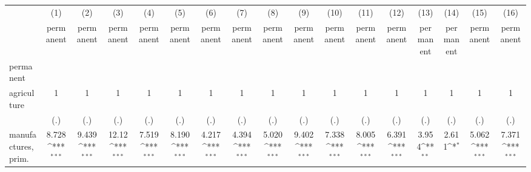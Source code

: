 {
\def\sym#1{\ifmmode^{#1}\else\(^{#1}\)\fi}
\begin{tabular}{l*{16}{c}}
\hline\hline
                    &\multicolumn{1}{c}{(1)}&\multicolumn{1}{c}{(2)}&\multicolumn{1}{c}{(3)}&\multicolumn{1}{c}{(4)}&\multicolumn{1}{c}{(5)}&\multicolumn{1}{c}{(6)}&\multicolumn{1}{c}{(7)}&\multicolumn{1}{c}{(8)}&\multicolumn{1}{c}{(9)}&\multicolumn{1}{c}{(10)}&\multicolumn{1}{c}{(11)}&\multicolumn{1}{c}{(12)}&\multicolumn{1}{c}{(13)}&\multicolumn{1}{c}{(14)}&\multicolumn{1}{c}{(15)}&\multicolumn{1}{c}{(16)}\\
                    &\multicolumn{1}{c}{permanent}&\multicolumn{1}{c}{permanent}&\multicolumn{1}{c}{permanent}&\multicolumn{1}{c}{permanent}&\multicolumn{1}{c}{permanent}&\multicolumn{1}{c}{permanent}&\multicolumn{1}{c}{permanent}&\multicolumn{1}{c}{permanent}&\multicolumn{1}{c}{permanent}&\multicolumn{1}{c}{permanent}&\multicolumn{1}{c}{permanent}&\multicolumn{1}{c}{permanent}&\multicolumn{1}{c}{permanent}&\multicolumn{1}{c}{permanent}&\multicolumn{1}{c}{permanent}&\multicolumn{1}{c}{permanent}\\
\hline
permanent           &                     &                     &                     &                     &                     &                     &                     &                     &                     &                     &                     &                     &                     &                     &                     &                     \\
agriculture         &           1         &           1         &           1         &           1         &           1         &           1         &           1         &           1         &           1         &           1         &           1         &           1         &           1         &           1         &           1         &           1         \\
                    &         (.)         &         (.)         &         (.)         &         (.)         &         (.)         &         (.)         &         (.)         &         (.)         &         (.)         &         (.)         &         (.)         &         (.)         &         (.)         &         (.)         &         (.)         &         (.)         \\
[1em]
manufactures, prim. &       8.728\sym{***}&       9.439\sym{***}&       12.12\sym{***}&       7.519\sym{***}&       8.190\sym{***}&       4.217\sym{***}&       4.394\sym{***}&       5.020\sym{***}&       9.402\sym{***}&       7.338\sym{***}&       8.005\sym{***}&       6.391\sym{***}&       3.954\sym{**} &       2.611\sym{*}  &       5.062\sym{***}&       7.371\sym{***}\\

\end{tabular}}
